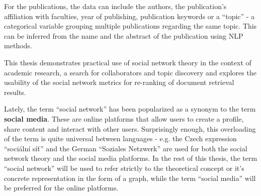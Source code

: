 For the publications, the data can include the authors, the publication's affiliation with faculties, year of publishing, publication keywords or a ``topic'' - a categorical variable grouping multiple publications regarding the same topic. This can be inferred from the name and the abstract of the publication using NLP methods.

This thesis demonstrates practical use of social network theory in the context of academic research, a search for collaborators and topic discovery and explores the usability of the social network metrics for re-ranking of document retrieval results.

Lately, the term ``social network'' has been popularized as a synonym to the term \textbf{social media}.
These are online platforms that allow users to create a profile, share content and interact with other users.
Surprisingly enough, this overloading of the term is quite universal between languages - e.g. the Czech expression ``sociální síť'' and the German ``Soziales Netzwerk'' are used for both the social network theory and the social media platforms.
In the rest of this thesis, the term ``social network'' will be used to refer strictly to the theoretical concept or it's concrete representation in the form of a graph, while the term ``social media'' will be preferred for the online platforms.